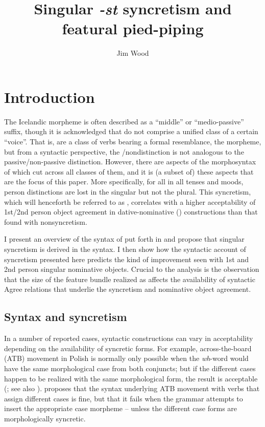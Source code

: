 \documentclass[output=paper]{langscibook}
\author{Jim Wood\affiliation{Yale University}}
\title{Singular \textit{-st} syncretism and featural pied-piping}
\begin{document}
\maketitle

\section{Introduction}\label{woodsecexs}

The Icelandic \sti morpheme is often described as a “middle” or “medio-passive” suffix, though it is acknowledged that \stvs do not comprise a unified class of a certain “voice”. That is, \stvs are a class of verbs bearing a formal resemblance, the \sti morpheme, but from a syntactic perspective, the \stin/non\sti distinction is not analogous to the passive\slash non-passive distinction.  However, there are aspects of the morphosyntax of \stvs which cut across all classes of them, and it is (a subset of) these aspects that are the focus of this paper. More specifically, for all \stvs in all tenses and moods, person distinctions are lost in the singular but not the plural. This syncretism, which will henceforth be referred to as , correlates with a higher acceptability of 1st/2nd person object agreement in dative-nominative (\datnomn) constructions than that found with non\sti syncretism.  

I present an overview of the syntax of \sti put forth in  \citet{wood:refl,Wood2015book} and propose that singular \sti syncretism is derived in the syntax. I then show how the syntactic account of \sti syncretism presented here predicts the kind of improvement seen with 1st and 2nd person singular nominative objects. Crucial to the analysis is the observation that the size of the feature bundle realized as \sti affects the availability of syntactic Agree relations that underlie the syncretism and nominative object agreement. 


\subsection{Syntax and syncretism} 

In a number of reported cases, syntactic constructions can vary in acceptability depending on the availability of syncretic forms. For example, across-the-board (ATB)  movement in Polish is normally only possible when the \textit{wh}-word would have the same morphological case from both conjuncts; but if the different cases happen to be realized with the same morphological form, the result is acceptable (\citealt{citko2005nature,hein2020case}; see also \citealt[fn. 2]{Ximenes:2007vs}). \citet{citko2005nature} proposes that the syntax underlying ATB movement with verbs that assign different cases is fine, but that it fails when the grammar attempts to insert the appropriate case morpheme -- unless the different case forms are morphologically syncretic. 
\end{document}
